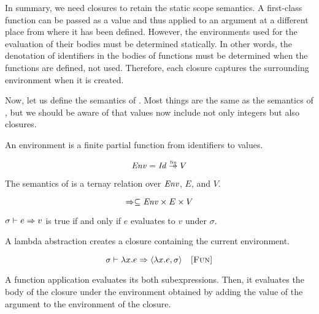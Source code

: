In summary, we need closures to retain the static scope semantics. A first-class
function can be passed as a value and thus applied to an argument at a different
place from where it has been defined. However, the environments used for the
evaluation of their bodies must be determined statically. In other words,
the denotation of identifiers in the bodies of functions must be determined when
the functions are defined, not used. Therefore, each closure captures the surrounding
environment when it is created.

Now, let us define the semantics of \lang. Most things are the same as the
semantics of \plang, but we should be aware of that values now include not only
integers but also closures.

An environment is a finite partial function from identifiers to values.

\[ \embox{Env}=\embox{Id}\finto V \]

The semantics of \lang is a ternay relation over $\mbox{\emph{Env}}$, $E$, and $V$.

\[\Rightarrow\subseteq\mbox{\emph{Env}}\times E\times V\]

$\sigma\vdash e\Rightarrow v$ is true if and only if $e$ evaluates to $v$ under $\sigma$.

A lambda abstraction creates a closure containing the current environment.


\vspace{-1em}

\[
  \sigma\vdash\lambda x.e\Rightarrow\langle\lambda x.e,\sigma\rangle
  \quad\textsc{[Fun]}
\]

A function application evaluates its both subexpressions. Then, it evaluates the
body of the closure under the environment obtained by adding the value of the
argument to the environment of the closure.


\vspace{-1em}

